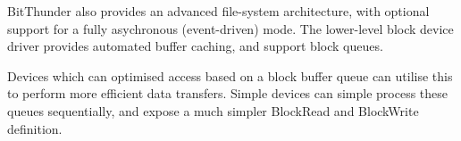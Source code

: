 BitThunder also provides an advanced file-system architecture, with optional support
for a fully asychronous (event-driven) mode. The lower-level block device driver
provides automated buffer caching, and support block queues.

Devices which can optimised access based on a block buffer queue can utilise this to perform
more efficient data transfers. Simple devices can simple process these queues sequentially,
and expose a much simpler BlockRead and BlockWrite definition.
